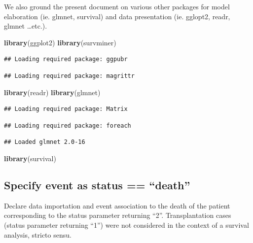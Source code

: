 \documentclass[]{article}
\newenvironment{Shaded}{\begin{snugshade}}{\end{snugshade}}
\newcommand{\KeywordTok}[1]{\textcolor[rgb]{0.13,0.29,0.53}{\textbf{#1}}}
\newcommand{\NormalTok}[1]{#1}
\begin{document}
We also ground the present document on various other packages for model
elaboration (ie. glmnet, survival) and data presentation (ie. gglopt2,
readr, glmnet \ldots{}etc.).

\begin{Shaded}
\begin{Highlighting}[]
\KeywordTok{library}\NormalTok{(ggplot2)}
\KeywordTok{library}\NormalTok{(survminer)}
\end{Highlighting}
\end{Shaded}

\begin{verbatim}
## Loading required package: ggpubr
\end{verbatim}

\begin{verbatim}
## Loading required package: magrittr
\end{verbatim}

\begin{Shaded}
\begin{Highlighting}[]
\KeywordTok{library}\NormalTok{(readr)}
\KeywordTok{library}\NormalTok{(glmnet)}
\end{Highlighting}
\end{Shaded}

\begin{verbatim}
## Loading required package: Matrix
\end{verbatim}

\begin{verbatim}
## Loading required package: foreach
\end{verbatim}

\begin{verbatim}
## Loaded glmnet 2.0-16
\end{verbatim}

\begin{Shaded}
\begin{Highlighting}[]
\KeywordTok{library}\NormalTok{(survival)}
\end{Highlighting}
\end{Shaded}

\subsection{\texorpdfstring{Specify event as status ==
``death''}{Specify event as status == death}}\label{specify-event-as-status-death}

Declare data importation and event association to the death of the
patient corresponding to the status parameter returning ``2''.
Transplantation cases (status parameter returning ``1'') were not
considered in the context of a survival analysis, stricto sensu.
\end{document}
